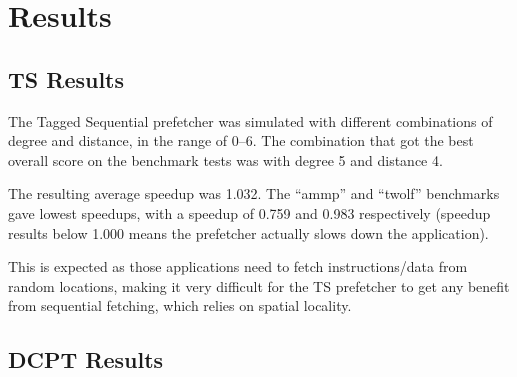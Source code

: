 \section{Results}
\label{sec:res}

\subsection{TS Results}

The Tagged Sequential prefetcher was simulated with different combinations of
degree and distance, in the range of 0--6. The combination that got the best
overall score on the benchmark tests was with degree 5 and distance 4.

The resulting average speedup was 1.032. The ``ammp'' and ``twolf'' benchmarks
gave lowest speedups, with a speedup of 0.759 and 0.983 respectively (speedup
results below 1.000 means the prefetcher actually slows down the application).

This is expected as those applications need to fetch instructions/data from
random locations, making it very difficult for the TS prefetcher
to get any benefit from sequential fetching, which relies on spatial locality.

\subsection{DCPT Results}


